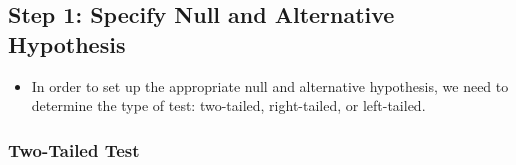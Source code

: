 \documentclass[
  letterpaper,
  DIV=11,
  numbers=noendperiod]{scrreprt}
\providecommand{\tightlist}{%
  \setlength{\itemsep}{0pt}\setlength{\parskip}{0pt}}\usepackage{longtable,booktabs,array}
\begin{document}
\subsection{Step 1: Specify Null and Alternative
Hypothesis}\label{step-1-specify-null-and-alternative-hypothesis}

\begin{itemize}
\tightlist
\item
  In order to set up the appropriate null and alternative hypothesis, we
  need to determine the type of test: two-tailed, right-tailed, or
  left-tailed.
\end{itemize}

\subsubsection{Two-Tailed Test}\label{two-tailed-test}
\end{document}

